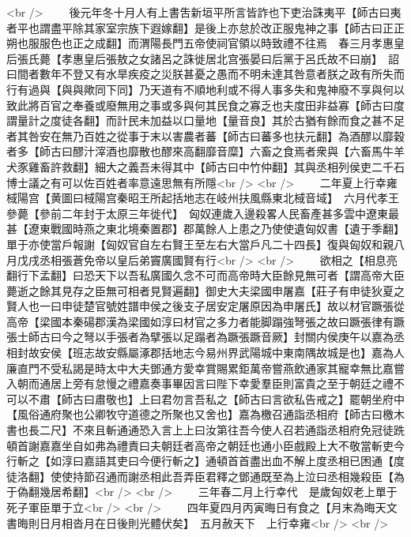 <br />
　　後元年冬十月人有上書吿新垣平所言皆詐也下吏治誅夷平【師古曰夷者平也謂盡平除其家室宗族下遐嫁翻】是後上亦怠於改正服鬼神之事【師古曰正正朔也服服色也正之成翻】而渭陽長門五帝使祠官領以時致禮不往焉　春三月孝惠皇后張氏薨【孝惠皇后張敖之女諸呂之誅徙居北宫張晏曰后黨于呂氏故不曰崩】　詔曰間者數年不登又有水旱疾疫之災朕甚憂之愚而不明未達其咎意者朕之政有所失而行有過與【與與歟同下同】乃天道有不順地利或不得人事多失和鬼神廢不享與何以致此將百官之奉養或廢無用之事或多與何其民食之寡乏也夫度田非益寡【師古曰度謂量計之度徒各翻】而計民未加益以口量地【量音良】其於古猶有餘而食之甚不足者其咎安在無乃百姓之從事于末以害農者蕃【師古曰蕃多也扶元翻】為酒醪以靡穀者多【師古曰醪汁滓酒也靡散也醪來高翻靡音糜】六畜之食焉者衆與【六畜馬牛羊犬豕雞畜許救翻】細大之義吾未得其中【師古曰中竹仲翻】其與丞相列侯吏二千石博士議之有可以佐百姓者率意遠思無有所隱<br />
<br />
　　二年夏上行幸雍棫陽宫【黄圖曰棫陽宫秦昭王所起括地志在岐州扶風縣東北棫音域】　六月代孝王參薨【參前二年封于太原三年徙代】　匈奴連歲入邊殺畧人民畜產甚多雲中遼東最甚【遼東戰國時燕之東北境秦置郡】郡萬餘人上患之乃使使遺匈奴書【遺于季翻】單于亦使當戶報謝【匈奴官自左右賢王至左右大當戶凡二十四長】復與匈奴和親八月戊戌丞相張蒼免帝以皇后弟竇廣國賢有行<br />
<br />
　　欲相之【相息亮翻行下孟翻】曰恐天下以吾私廣國久念不可而高帝時大臣餘見無可者【謂高帝大臣薨逝之餘其見存之臣無可相者見賢遍翻】御史大夫梁國申屠嘉【莊子有申徒狄夏之賢人也一曰申徒楚官號姓譜申侯之後支子居安定屠原因為申屠氏】故以材官蹶張從高帝【梁國本秦碭郡漢為梁國如淳曰材官之多力者能脚蹋強弩張之故曰蹶張律有蹶張士師古曰今之弩以手張者為擘張以足蹋者為蹶張蹶音厥】封關内侯庚午以嘉為丞相封故安侯【班志故安縣屬涿郡括地志今易州界武陽城中東南隅故城是也】嘉為人廉直門不受私謁是時太中大夫鄧通方愛幸賞賜累鉅萬帝嘗燕飲通家其寵幸無比嘉嘗入朝而通居上旁有怠慢之禮嘉奏事畢因言曰陛下幸愛羣臣則富貴之至于朝廷之禮不可以不肅【師古曰肅敬也】上曰君勿言吾私之【師古曰言欲私告戒之】罷朝坐府中【風俗通府聚也公卿牧守道德之所聚也又舍也】嘉為檄召通詣丞相府【師古曰檄木書也長二尺】不來且斬通通恐入言上上曰汝第往吾今使人召若通詣丞相府免冠徒跣頓首謝嘉嘉坐自如弗為禮責曰夫朝廷者高帝之朝廷也通小臣戲殿上大不敬當斬吏今行斬之【如淳曰嘉語其吏曰今便行斬之】通頓首首盡出血不解上度丞相已困通【度徒洛翻】使使持節召通而謝丞相此吾弄臣君釋之鄧通既至為上泣曰丞相幾殺臣【為于偽翻幾居希翻】<br />
<br />
　　三年春二月上行幸代　是歲匈奴老上單于死子軍臣單于立<br />
<br />
　　四年夏四月丙寅晦日有食之【月末為晦天文書晦則日月相沓月在日後則光體伏矣】　五月赦天下　上行幸雍<br />
<br />
